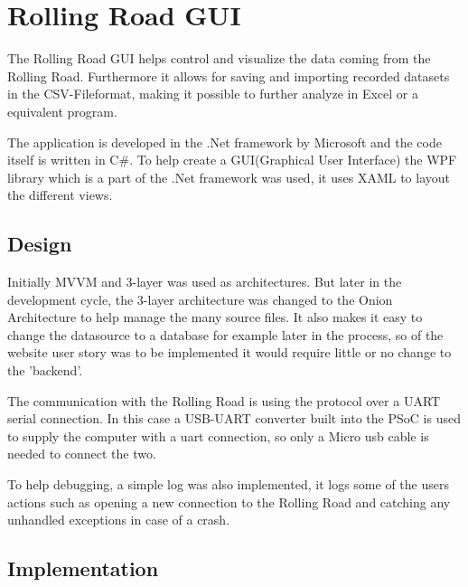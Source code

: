 \section{Rolling Road GUI}

The Rolling Road GUI helps control and visualize the data coming from the Rolling Road. Furthermore it allows for saving and importing recorded datasets in the CSV-Fileformat, making it possible to further analyze in Excel or a equivalent program.

The application is developed in the .Net framework by Microsoft and the code itself is written in C\#.
To help create a GUI(Graphical User Interface) the WPF library which is a part of the .Net framework was used, it uses XAML to layout the different views.

\subsection{Design}

Initially MVVM and 3-layer was used as architectures. But later in the development cycle, the 3-layer architecture was changed to the Onion Architecture to help manage the many source files. It also makes it easy to change the datasource to a database for example later in the process, so of the website user story was to be implemented it would require little or no change to the 'backend'.

The communication with the Rolling Road is using the  protocol over a UART serial connection. In this case a USB-UART converter built into the PSoC is used to supply the computer with a uart connection, so only a Micro usb cable is needed to connect the two.

To help debugging, a simple log was also implemented, it logs some of the users actions such as opening a new connection to the Rolling Road and catching any unhandled exceptions in case of a crash.

\subsection{Implementation}